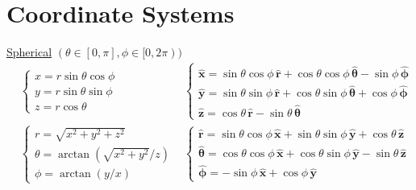 \section*{Coordinate Systems}
\underline{Spherical} $(\theta \in [0, \pi], \phi \in [0, 2\pi))$
\begin{align*}
&\begin{cases} 
x = r \sin\theta\cos\phi \\ 
y = r \sin\theta\sin\phi \\ 
z = r \cos\theta 
\end{cases}
&
\begin{cases} 
\mathbf{\hat{x}} = \sin\theta\cos\phi\,\mathbf{\hat{r}} + \cos\theta\cos\phi\,\bm{\hat{\theta}} - \sin\phi\,\bm{\hat{\phi}} \\
\mathbf{\hat{y}} = \sin\theta\sin\phi\,\mathbf{\hat{r}} + \cos\theta\sin\phi\,\bm{\hat{\theta}} + \cos\phi\,\bm{\hat{\phi}} \\
\mathbf{\hat{z}} = \cos\theta\,\mathbf{\hat{r}} - \sin\theta\,\bm{\hat{\theta}} 
\end{cases}
\\[0pt]
&\begin{cases} 
r = \sqrt{x^2+y^2+z^2} \\ 
\theta = \arctan(\sqrt{x^2+y^2}/z) \\ 
\phi = \arctan(y/x) 
\end{cases}
&
\begin{cases} 
\mathbf{\hat{r}} = \sin\theta\cos\phi\,\mathbf{\hat{x}} + \sin\theta\sin\phi\,\mathbf{\hat{y}} + \cos\theta\,\mathbf{\hat{z}} \\ 
\bm{\hat{\theta}} = \cos\theta\cos\phi\,\mathbf{\hat{x}} + \cos\theta\sin\phi\,\mathbf{\hat{y}} - \sin\theta\,\mathbf{\hat{z}} \\ 
\bm{\hat{\phi}} = -\sin\phi\,\mathbf{\hat{x}} + \cos\phi\,\mathbf{\hat{y}} 
\end{cases}
\end{align*}

